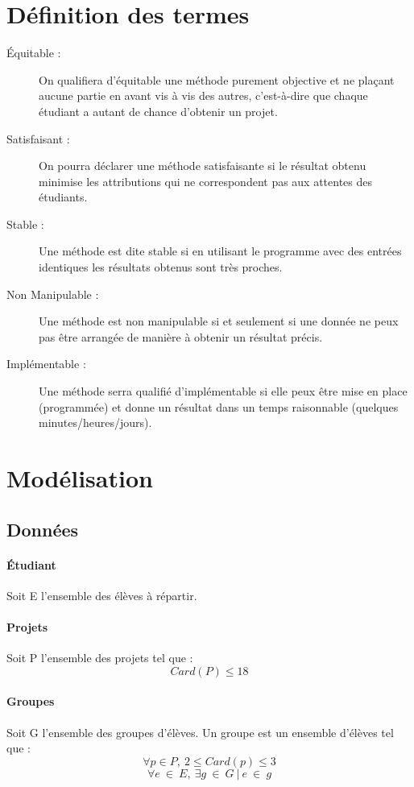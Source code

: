 \documentclass[10pt,a4paper]{article}
\begin{document}
\section{Définition des termes}
\begin{description}
\item[Équitable :]
On qualifiera d'équitable une méthode purement objective et ne plaçant aucune partie en avant vis à vis des autres, c'est-à-dire que chaque étudiant a autant de chance d'obtenir un projet.
\item[Satisfaisant :]
On pourra déclarer une méthode satisfaisante si le résultat obtenu minimise les attributions qui ne correspondent pas aux attentes des étudiants.
\item[Stable :]
Une méthode est dite stable si en utilisant le programme avec des entrées identiques les résultats obtenus sont très proches.
\item[Non Manipulable :]
Une méthode est non manipulable si et seulement si une donnée ne peux pas être arrangée de manière à obtenir un résultat précis.
\item[Implémentable :]
Une méthode serra qualifié d'implémentable si elle peux être mise en place (programmée) et donne un résultat dans un temps raisonnable (quelques minutes/heures/jours).
\end{description}
\section{Modélisation}
\subsection{Données}
\paragraph{Étudiant}Soit E l'ensemble des élèves à répartir.
\paragraph{Projets}Soit P l'ensemble des projets tel que :
$$Card(P)\leqslant 18$$

\paragraph{Groupes}Soit G l'ensemble des groupes d'élèves. Un groupe est un ensemble d'élèves tel que :
$$\forall p \in P,\ 2\leqslant Card(p)\leqslant 3$$
$$\forall e\ \in \ E,\ \exists g \ \in \ G \ | \ e \ \in \ g$$ 
\end{document}
